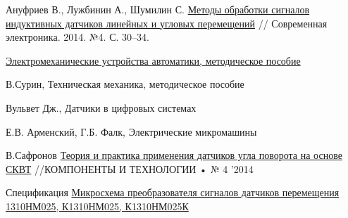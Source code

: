 \newpage
{} %


\begin{thebibliography}{9}
    Ануфриев В., Лужбинин А., Шумилин С. 
    \href{https://www.milandr.ru/upload/iblock/4bf/4bf1c97fcce296a450d7b68bb0fc65b0.pdf}{Методы обработки сигналов индуктивных датчиков линейных и угловых перемещений} // Современная электроника. 2014. №4. С. 30–34.

    \href{https://servomotors.ru/documentation/electromechanical_automation_devices/book/about.html}{Электромеханические устройства автоматики, методическое пособие} 

     В.Сурин, Техническая механика, методическое пособие 

     Вульвет Дж., Датчики в цифровых системах

     Е.В. Арменский, Г.Б. Фалк, Электрические микромашины

    В.Сафронов
    \href{file:///home/viktor/Downloads/teoriya-i-praktika-primeneniya-datchikov-ugla-povorota-na-osnove-skvt.pdf}{Теория и практика применения датчиков угла поворота на основе СКВТ} 
    //КОМПОНЕНТЫ И ТЕХНОЛОГИИ • № 4 '2014

     Спецификация \href{https://support.milandr.ru/upload/iblock/6ba/e7vag2ixn36hmunuwj0av6g1gbcgvxbf/1310НМ025.pdf?ysclid=maczx9xrgr189178383}
    {Микросхема преобразователя сигналов датчиков перемещения 1310НМ025, К1310НМ025, К1310НМ025К}
\end{thebibliography} 